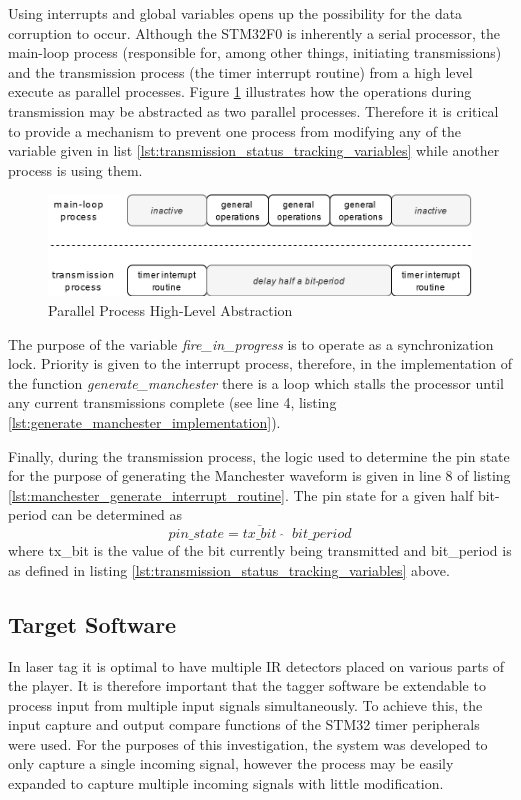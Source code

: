 Using interrupts and global variables opens up the possibility for the data corruption to occur. Although the STM32F0 is inherently a serial processor, the main-loop process (responsible for, among other things, initiating transmissions) and the transmission process (the timer interrupt routine) from a high level execute as parallel processes. Figure \ref{fig:parallel_process_abstraction} illustrates how the operations during transmission may be abstracted as two parallel processes. Therefore it is critical to provide a mechanism to prevent one process from modifying any of the variable given in list \ref{lst:transmission_status_tracking_variables} while another process is using them.

\begin{figure}[H]
	\centering
	\includegraphics[width=0.8\linewidth]{figures/design/parallel_process_transmission.png}
	\caption{Parallel Process High-Level Abstraction}
	\label{fig:parallel_process_abstraction}
\end{figure}

The purpose of the variable \textit{fire\_in\_progress} is to operate as a synchronization lock. Priority is given to the interrupt process, therefore, in the implementation of the function \textit{generate\_manchester} there is a loop which stalls the processor until any current transmissions complete (see line 4, listing \ref{lst:generate_manchester_implementation}).

Finally, during the transmission process, the logic used to determine the pin state for the purpose of generating the Manchester waveform is given in line 8 of listing \ref{lst:manchester_generate_interrupt_routine}. The pin state for a given half bit-period can be determined as \[pin\_state = \overline{tx\_bit} \;\; \widehat{} \;\; bit\_period\] where tx\_bit is the value of the bit currently being transmitted and bit\_period is as defined in listing \ref{lst:transmission_status_tracking_variables} above.


\subsection{Target Software}

In laser tag it is optimal to have multiple IR detectors placed on various parts of the player. It is therefore important that the tagger software be extendable to process input from multiple input signals simultaneously. To achieve this, the input capture and output compare functions of the STM32 timer peripherals were used. For the purposes of this investigation, the system was developed to only capture a single incoming signal, however the process may be easily expanded to capture multiple incoming signals with little modification.

